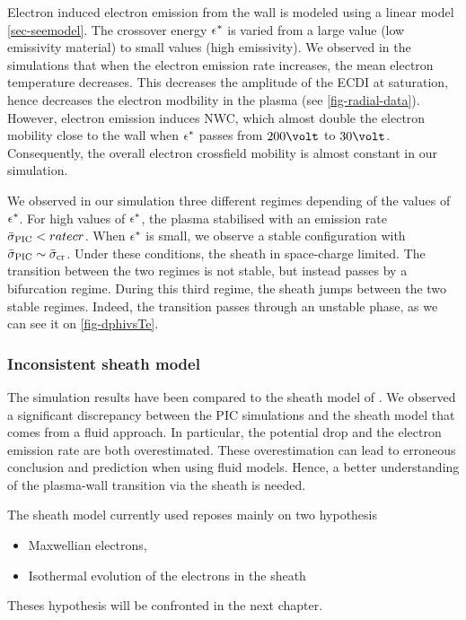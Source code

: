   Electron induced electron emission from the wall is modeled using a linear model \vref{sec-seemodel}.
  The crossover energy $\epsilon^{*}$ is varied from a large value (low emissivity material) to small values (high emissivity).
  We observed in the simulations that when the electron emission rate increases, the mean electron temperature decreases.
  This decreases the amplitude of the \ac{ECDI} at saturation, hence decreases the electron modbility in the plasma (see \vref{fig-radial-data}).
  However, electron emission induces \ac{NWC}, which almost double the electron mobility close to the wall when $\epsilon^{*}$ passes from $200\volt$ to $30\volt$.
  Consequently, the overall electron crossfield mobility is almost constant in our simulation.
  
  We observed in our simulation three different regimes depending of the values of $\epsilon^{*}$.
  For high values of $\epsilon^{*}$, the plasma stabilised with an emission rate $ \bar{\sigma }_{\rm PIC} < ratecr$.
  When $\epsilon^{*}$ is small, we observe a stable configuration with $ \bar{\sigma }_{\rm PIC} \sim  \bar{\sigma }_{\rm cr}$.
  Under these conditions, the sheath in space-charge limited.
  The transition between the two regimes is not stable, but instead passes by a bifurcation regime.
  During this third regime, the sheath jumps between the two stable regimes.
  Indeed, the transition passes through an unstable phase, as we can see it on \vref{fig-dphivsTe}.
  

  \subsubsection*{Inconsistent sheath model }
  
  The simulation results have been compared to the sheath model of \citet{hobbs1967}.
  We observed a significant discrepancy between the \ac{PIC} simulations and the sheath model that comes from a fluid approach.
  In particular, the potential drop and the electron emission rate are both overestimated.
  These overestimation can lead to erroneous conclusion and prediction when using fluid models.
  Hence, a better understanding of the plasma-wall transition via the sheath is needed.
  
  The sheath model currently used reposes mainly on two hypothesis
  \begin{itemize}
    \item Maxwellian electrons,
    \item Isothermal evolution of the electrons in the sheath
  \end{itemize}
  
  Theses hypothesis will be confronted in the next chapter.
  